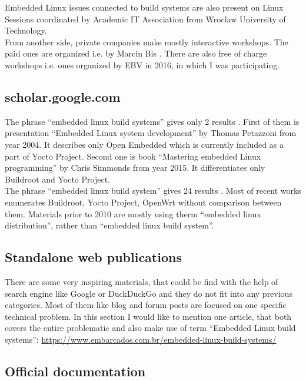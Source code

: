 \documentclass[printmode]{mgr}
\begin{document}
Embedded Linux issues connected to build systems are also present on Linux Sessions \cite{web:sesja-linuksowa} coordinated by Academic IT Association from Wroclaw University of Technology. \\

From another side, private companies make mostly interactive workshops. The paid ones are organized i.e. by Marcin Bis \cite{web:bis-szkolenia}. There are also free of charge workshops i.e. ones organized by EBV in 2016, in which I was participating.

\subsection{scholar.google.com}

The phrase ``embedded linux build systems'' gives only 2 results  \cite{web:scholar-1}. First of them is presentation ``Embedded Linux system development'' by Thomas Petazzoni from year 2004. It describes only Open Embedded which is currently included as a part of Yocto Project. Second one is book ``Mastering embedded Linux programming'' by Chris Simmonds from year 2015. It differentiates only Buildroot and Yocto Project. \\

The phrase ``embedded linux build system'' gives 24 results \cite{web:scholar-2}. Most of recent works enumerates Buildroot, Yocto Project, OpenWrt without comparison between them. Materials prior to 2010 are mostly using therm ``embedded linux distribution'', rather than ``embedded linux build system''.

\subsection{Standalone web publications}

There are some very inspiring materials, that could be find with the help of search engine like Google or DuckDuckGo and they do not fit into any previous categories.
Most of them like blog and forum posts are focused on one specific technical problem.
In this section I would like to mention one article, that both covers the entire problematic and also make use of term ``Embedded Linux build systems'': \url{https://www.embarcados.com.br/embedded-linux-build-systems/}

\subsection{Official documentation}
\end{document}
